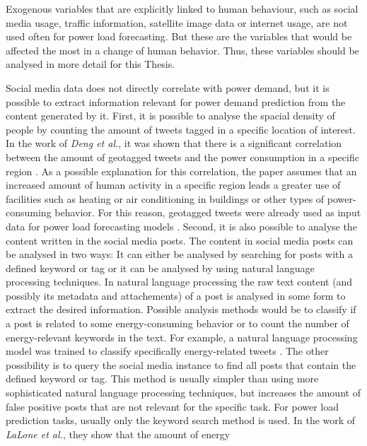 Exogenous variables that are explicitly linked to human behaviour, 
such as social media usage, traffic information, satellite image data or 
internet usage, are not used often for power load forecasting. 
But these are the variables that would be affected the most in a change of 
human behavior. Thus, these variables should be analysed in more detail 
for this Thesis.

Social media data does not directly correlate with power demand, but it is
possible to extract information relevant for power demand prediction
from the content generated by it.
First, it is possible to analyse the spacial density of people by 
counting the amount of tweets tagged in a specific location of interest. 
In the work of \textit{Deng et al.},
it was shown that there is a significant
correlation between the amount of geotagged tweets
and the power consumption in a specific region \cite{twittergeoloccorr}.
As a possible explanation for this correlation, the paper assumes that 
an increased amount of human activity in a specific region leads a greater 
use of facilities such as heating or air conditioning in buildings or 
other types of power-consuming behavior.
For this reason, geotagged tweets were already used as input data for 
power load forecasting models 
\cite{twittergeolocforecasting} \cite{twittergeolocforecasting2}.
Second, it is also possible to analyse the content written in the 
social media posts. The content in social media posts can be 
analysed in two ways: 
It can either be analysed by searching for posts with a defined keyword or tag
or it can be analysed by using natural language processing techniques. 
In natural language processing the raw text content 
(and possibly its metadata and attachements) of a post is analysed
in some form to extract the desired information. Possible analysis
methods would be to classify if a post is related to some energy-consuming
behavior or to count the number of energy-relevant keywords in the text.
For example, a natural language processing model was trained to 
classify specifically energy-related tweets \cite{energybert}.
The other possibility is to query the social media instance 
to find all posts that contain the defined keyword or tag.
This method is usually simpler than using more sophisticated natural 
language processing techniques, but increases the amount of false positive 
posts that are not relevant for the specific task.
For power load prediction tasks, usually only the keyword search method is used.
In the work of \textit{LaLone et al.}, they show that the amount of energy
